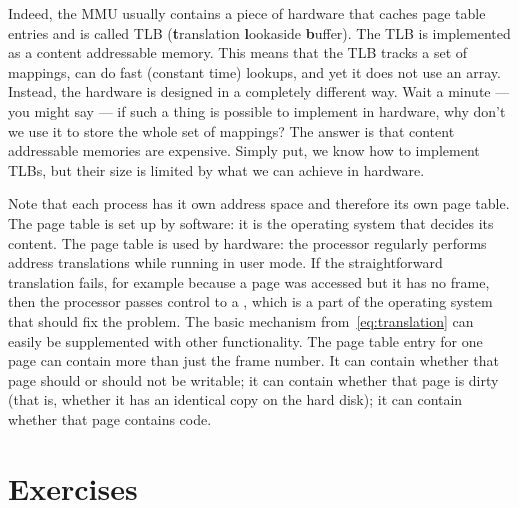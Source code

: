 Indeed, the MMU usually contains a piece of hardware that caches page table entries
  and is called TLB ({\bf t}ranslation {\bf l}ookaside {\bf b}uffer).
The TLB is implemented as a content addressable memory.
This means that the TLB tracks a set of mappings,
  can do fast (constant time) lookups,
  and yet it does not use an array.
Instead, the hardware is designed in a completely different way.
Wait a minute --- you might say ---
  if such a thing is possible to implement in hardware,
  why don't we use it to store the whole set of mappings?
The answer is that content addressable memories are expensive.
Simply put, we know how to implement TLBs,
  but their size is limited by what we can achieve in hardware.

\smallskip

Note that each process has it own address space and therefore its own page table.
The page table is set up by software:
  it is the operating system that decides its content.
The page table is used by hardware:
  the processor regularly performs address translations while running in user mode.
If the straightforward translation fails,
  for example because a page was accessed but it has no frame,
  then the processor passes control to a ,
    which is a part of the operating system that should fix the problem.
The basic mechanism from~\eqref{eq:translation}
  can easily be supplemented with other functionality.
The page table entry for one page can contain more than just the frame number.
It can contain whether that page should or should not be writable;
  it can contain whether that page is dirty
    (that is, whether it has an identical copy on the hard disk);
  it can contain whether that page contains code.





\section{Exercises}

